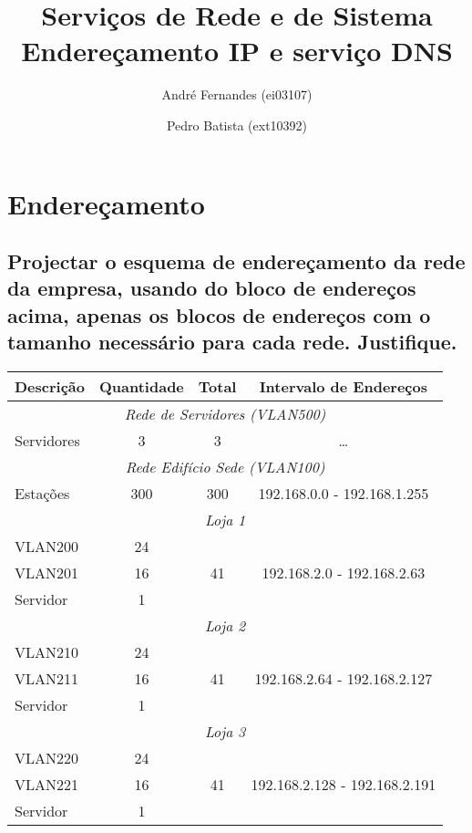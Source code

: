 \documentclass[a4paper,12pt]{article}
\title{Serviços de Rede e de Sistema \\
Endereçamento IP e serviço DNS}
\author{André Fernandes (ei03107) \and Pedro Batista (ext10392)}
\begin{document}
\maketitle

\section{Endereçamento}
\subsection{Projectar o esquema de endereçamento da rede da empresa,
usando do bloco de endereços acima, apenas os blocos de endereços com
o tamanho necessário para cada rede. Justifique.}

\begin{table}[h]
   \centering
   \begin{tabular}{ l | c | c | c }
      \toprule
      \textbf{Descrição} & \textbf{Quantidade} & \textbf{Total} & \textbf{Intervalo de Endereços} \\\hline

      \multicolumn{4}{c}{\textit{Rede de Servidores (VLAN500)}} \\\hline
      Servidores & 3 & 3 & \ldots \\\hline

      \multicolumn{4}{c}{\textit{Rede Edifício Sede (VLAN100)}} \\ \hline
      Estações & 300 & 300 & 192.168.0.0 - 192.168.1.255 \\ \hline

      \multicolumn{4}{c}{\textit{Loja 1 }} \\\hline
      VLAN200 & 24 & \multirow{3}{*}{41} & \multirow{3}{*}{192.168.2.0 - 192.168.2.63} \\\cline{1-2}
      VLAN201 & 16 & \\\cline{1-2}
      Servidor & 1 & \\ \hline
      \multicolumn{4}{c}{\textit{Loja 2}} \\\hline
      VLAN210 & 24 & \multirow{3}{*}{41} & \multirow{3}{*}{192.168.2.64 - 192.168.2.127} \\\cline{1-2}
      VLAN211 & 16 & \\\cline{1-2}
      Servidor & 1 & \\ \hline
      \multicolumn{4}{c}{\textit{Loja 3}} \\\hline
      VLAN220 & 24 & \multirow{3}{*}{41} & \multirow{3}{*}{192.168.2.128 - 192.168.2.191} \\\cline{1-2}
      VLAN221 & 16 & \\\cline{1-2}
      Servidor & 1 & \\ \hline


\end{tabular}
\end{table}
\end{document}
